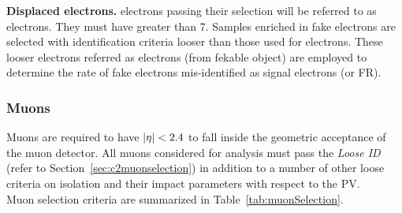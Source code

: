\textbf {Displaced electrons.}
\Displ electrons passing their selection will be referred to as
\tD electrons.
They must have \pt greater than 7\GeV.
Samples enriched in fake electrons are selected with
identification criteria looser than those used for \tD
electrons. These looser electrons referred as \fo electrons (from
fekable object) are employed to determine the rate of fake electrons
mis-identified as signal electrons (\fr or FR).
\begin{table}[h!]
  \centering
  \caption{\label{tab:electronSelection} Requirements for an electron
    to pass each of the defined selection working points. Variables
    defined in Section~\ref{sec:c2variables}.}
\end{table}

\subsubsection{Muons}\label{sec:llmuon}
Muons are required to have
$|\eta|<2.4$ to fall inside the geometric acceptance of the muon
detector.
All muons considered for analysis must pass the \emph{Loose ID} (refer
to Section~\ref{sec:c2muonselection}) in addition to a number
of other loose criteria on isolation and their impact parameters with
respect to the PV.\\
Muon selection criteria are summarized in
Table~\ref{tab:muonSelection}.

